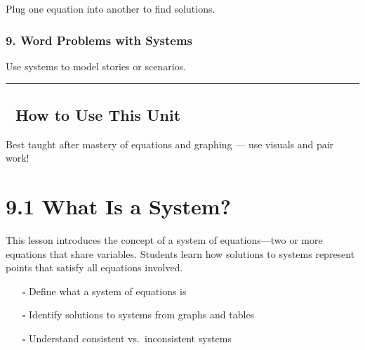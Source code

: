 \documentclass[
  letterpaper,
  DIV=11,
  numbers=noendperiod]{scrreprt}
\providecommand{\tightlist}{%
  \setlength{\itemsep}{0pt}\setlength{\parskip}{0pt}}
\begin{document}
Plug one equation into another to find solutions.

\subsection*{9. Word Problems with
Systems}\label{word-problems-with-systems}

Use systems to model stories or scenarios.

\begin{center}\rule{0.5\linewidth}{0.5pt}\end{center}

\section*{🧭 How to Use This Unit}\label{how-to-use-this-unit-6}


Best taught after mastery of equations and graphing --- use visuals and
pair work!

\chapter*{9.1 What Is a System?}\label{what-is-a-system-1}


This lesson introduces the concept of a system of equations---two or
more equations that share variables. Students learn how solutions to
systems represent points that satisfy all equations involved.

\begin{tcolorbox}[enhanced jigsaw, left=2mm, opacityback=0, colback=white, rightrule=.15mm, toptitle=1mm, colframe=quarto-callout-note-color-frame, leftrule=.75mm, toprule=.15mm, breakable, bottomtitle=1mm, bottomrule=.15mm, colbacktitle=quarto-callout-note-color!10!white, arc=.35mm, opacitybacktitle=0.6, titlerule=0mm, coltitle=black, title={🎯 Objectives}]

\begin{itemize}
\tightlist
\item[$\square$]
  Define what a system of equations is
\item[$\square$]
  Identify solutions to systems from graphs and tables
\item[$\square$]
  Understand consistent vs.~inconsistent systems
\end{itemize}

\end{tcolorbox}
\end{document}
